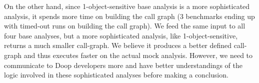 On the other hand, since 1-object-sensitive base analysis is a more sophisticated analysis, it spends more time on building the call graph (3 benchmarks ending up with timed-out runs on building the call graph). We feed the same input to all four base analyses, but a more sophisticated analysis, like 1-object-sensitive, returns a much smaller call-graph. We believe it produces a better defined call-graph and thus executes faster on the actual mock analysis. However, we need to communicate to Doop developers more and have better understandings of the logic involved in these sophisticated analyses before making a conclusion.





